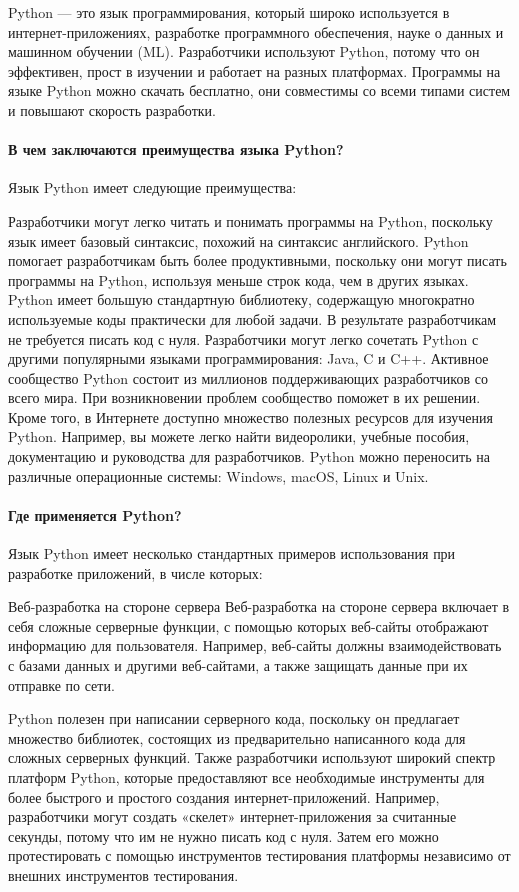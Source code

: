 Python — это язык программирования, который широко используется в интернет-приложениях, разработке программного обеспечения, науке о данных и машинном обучении (ML). Разработчики используют Python, потому что он эффективен, прост в изучении и работает на разных платформах. Программы на языке Python можно скачать бесплатно, они совместимы со всеми типами систем и повышают скорость разработки.

\paragraph{В чем заключаются преимущества языка Python?}
Язык Python имеет следующие преимущества:

Разработчики могут легко читать и понимать программы на Python, поскольку язык имеет базовый синтаксис, похожий на синтаксис английского. 
Python помогает разработчикам быть более продуктивными, поскольку они могут писать программы на Python, используя меньше строк кода, чем в других языках.
Python имеет большую стандартную библиотеку, содержащую многократно используемые коды практически для любой задачи. В результате разработчикам не требуется писать код с нуля.
Разработчики могут легко сочетать Python с другими популярными языками программирования: Java, C и C++.
Активное сообщество Python состоит из миллионов поддерживающих разработчиков со всего мира. При возникновении проблем сообщество поможет в их решении.
Кроме того, в Интернете доступно множество полезных ресурсов для изучения Python. Например, вы можете легко найти видеоролики, учебные пособия, документацию и руководства для разработчиков.
Python можно переносить на различные операционные системы: Windows, macOS, Linux и Unix.
\paragraph{Где применяется Python?}
Язык Python имеет несколько стандартных примеров использования при разработке приложений, в числе которых:

Веб-разработка на стороне сервера
Веб-разработка на стороне сервера включает в себя сложные серверные функции, с помощью которых веб-сайты отображают информацию для пользователя. Например, веб-сайты должны взаимодействовать с базами данных и другими веб-сайтами, а также защищать данные при их отправке по сети. 

Python полезен при написании серверного кода, поскольку он предлагает множество библиотек, состоящих из предварительно написанного кода для сложных серверных функций. Также разработчики используют широкий спектр платформ Python, которые предоставляют все необходимые инструменты для более быстрого и простого создания интернет-приложений. Например, разработчики могут создать «скелет» интернет-приложения за считанные секунды, потому что им не нужно писать код с нуля. Затем его можно протестировать с помощью инструментов тестирования платформы независимо от внешних инструментов тестирования.

